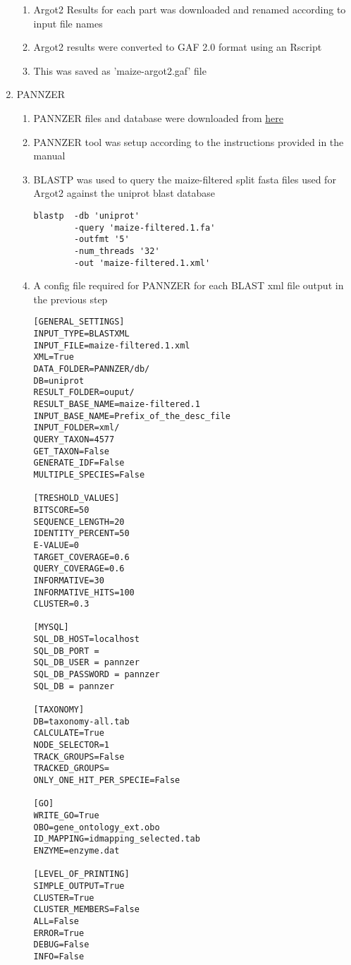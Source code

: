 \documentclass[11pt,letterpaper]{article}
\begin{document}
\begin{enumerate}
\begin{enumerate}
       \item Argot2 Results for each part was downloaded and renamed according to input file names
       \item Argot2 results were converted to GAF 2.0 format using an Rscript
       \item This was saved as 'maize-argot2.gaf' file
    \end{enumerate}
    \item PANNZER
    \begin{enumerate}
      \item PANNZER files and database were downloaded from \href{http://ekhidna.biocenter.helsinki.fi/pannzer/Download.html}{here}
      \item PANNZER tool was setup according to the instructions provided in the manual
      \item BLASTP was used to query the maize-filtered split fasta files used for Argot2 against the uniprot blast database
      \begin{verbatim}
blastp  -db 'uniprot'
        -query 'maize-filtered.1.fa'
        -outfmt '5'
        -num_threads '32'
        -out 'maize-filtered.1.xml'
      \end{verbatim}
      \item A config file required for PANNZER for each BLAST xml file output in the previous step
      \begin{lstlisting}[breaklines]
[GENERAL_SETTINGS]
INPUT_TYPE=BLASTXML
INPUT_FILE=maize-filtered.1.xml
XML=True
DATA_FOLDER=PANNZER/db/
DB=uniprot
RESULT_FOLDER=ouput/
RESULT_BASE_NAME=maize-filtered.1
INPUT_BASE_NAME=Prefix_of_the_desc_file
INPUT_FOLDER=xml/
QUERY_TAXON=4577
GET_TAXON=False
GENERATE_IDF=False
MULTIPLE_SPECIES=False

[TRESHOLD_VALUES]
BITSCORE=50
SEQUENCE_LENGTH=20
IDENTITY_PERCENT=50
E-VALUE=0
TARGET_COVERAGE=0.6
QUERY_COVERAGE=0.6
INFORMATIVE=30
INFORMATIVE_HITS=100
CLUSTER=0.3

[MYSQL]
SQL_DB_HOST=localhost
SQL_DB_PORT =
SQL_DB_USER = pannzer
SQL_DB_PASSWORD = pannzer
SQL_DB = pannzer

[TAXONOMY]
DB=taxonomy-all.tab
CALCULATE=True
NODE_SELECTOR=1
TRACK_GROUPS=False
TRACKED_GROUPS=
ONLY_ONE_HIT_PER_SPECIE=False

[GO]
WRITE_GO=True
OBO=gene_ontology_ext.obo
ID_MAPPING=idmapping_selected.tab
ENZYME=enzyme.dat

[LEVEL_OF_PRINTING]
SIMPLE_OUTPUT=True
CLUSTER=True
CLUSTER_MEMBERS=False
ALL=False
ERROR=True
DEBUG=False
INFO=False


\end{lstlisting}
\end{enumerate}
\end{enumerate}
\end{document}
